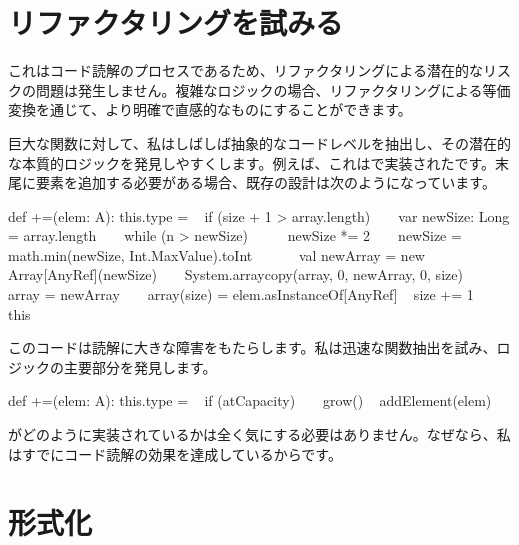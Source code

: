 \section{リファクタリングを試みる}

\begin{content}

これはコード読解のプロセスであるため、リファクタリングによる潜在的なリスクの問題は発生しません。複雑なロジックの場合、リファクタリングによる等価変換を通じて、より明確で直感的なものにすることができます。

巨大な関数に対して、私はしばしば抽象的なコードレベルを抽出し、その潜在的な本質的ロジックを発見しやすくします。例えば、これはで実装されたです。末尾に要素を追加する必要がある場合、既存の設計は次のようになっています。

\begin{leftbar}
\begin{python}
def +=(elem: A): this.type = {
  if (size + 1 > array.length) {
    var newSize: Long = array.length
    while (n > newSize)
      newSize *= 2
    newSize = math.min(newSize, Int.MaxValue).toInt
  
    val newArray = new Array[AnyRef](newSize)
    System.arraycopy(array, 0, newArray, 0, size)
    array = newArray
  }
  array(size) = elem.asInstanceOf[AnyRef]
  size += 1
  this
}
\end{python}
\end{leftbar}

このコードは読解に大きな障害をもたらします。私は迅速な関数抽出を試み、ロジックの主要部分を発見します。

\begin{leftbar}
\begin{python}
def +=(elem: A): this.type = {
  if (atCapacity)
    grow()
  addElement(elem)
}
\end{python}
\end{leftbar}

がどのように実装されているかは全く気にする必要はありません。なぜなら、私はすでにコード読解の効果を達成しているからです。

\end{content}

\section{形式化}

